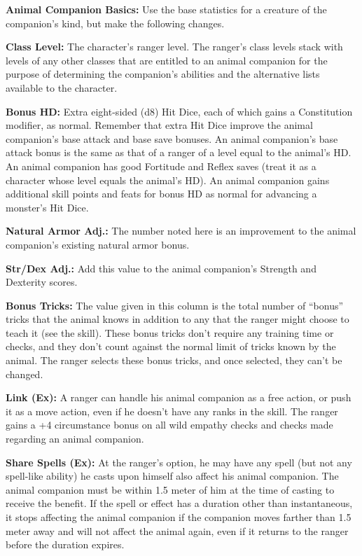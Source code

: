 \textbf{Animal Companion Basics:} Use the base statistics for a creature of the companion's kind, but make the following changes.

\textbf{Class Level:} The character's ranger level. The ranger's class levels stack with levels of any other classes that are entitled to an animal companion for the purpose of determining the companion's abilities and the alternative lists available to the character.

\textbf{Bonus HD:} Extra eight-sided (d8) Hit Dice, each of which gains a Constitution modifier, as normal. Remember that extra Hit Dice improve the animal companion's base attack and base save bonuses. An animal companion's base attack bonus is the same as that of a ranger of a level equal to the animal's HD. An animal companion has good Fortitude and Reflex saves (treat it as a character whose level equals the animal's HD). An animal companion gains additional skill points and feats for bonus HD as normal for advancing a monster's Hit Dice.

\textbf{Natural Armor Adj.:} The number noted here is an improvement to the animal companion's existing natural armor bonus.

\textbf{Str/Dex Adj.:} Add this value to the animal companion's Strength and Dexterity scores.

\textbf{Bonus Tricks:} The value given in this column is the total number of ``bonus'' tricks that the animal knows in addition to any that the ranger might choose to teach it (see the  skill). These bonus tricks don't require any training time or  checks, and they don't count against the normal limit of tricks known by the animal. The ranger selects these bonus tricks, and once selected, they can't be changed.

\textbf{Link (Ex):} A ranger can handle his animal companion as a free action, or push it as a move action, even if he doesn't have any ranks in the  skill. The ranger gains a +4 circumstance bonus on all wild empathy checks and  checks made regarding an animal companion.

\textbf{Share Spells (Ex):} At the ranger's option, he may have any spell (but not any spell-like ability) he casts upon himself also affect his animal companion. The animal companion must be within 1.5 meter of him at the time of casting to receive the benefit. If the spell or effect has a duration other than instantaneous, it stops affecting the animal companion if the companion moves farther than 1.5 meter away and will not affect the animal again, even if it returns to the ranger before the duration expires.

